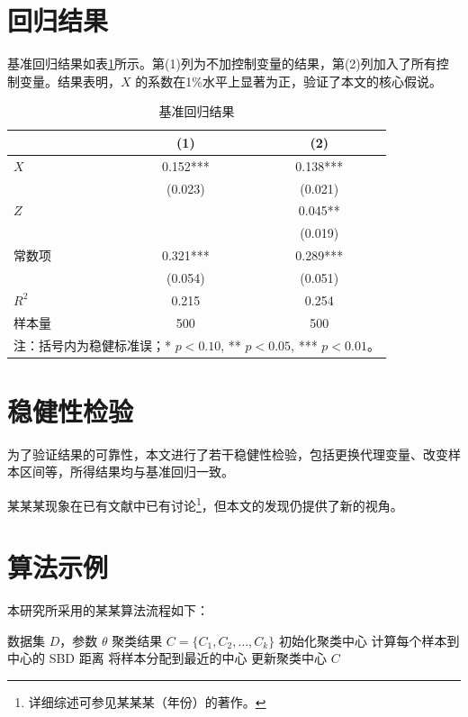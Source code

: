\documentclass[12pt,openright]{book}
\begin{document}
\section{回归结果}
基准回归结果如表\ref{tab:reg}所示。第(1)列为不加控制变量的结果，第(2)列加入了所有控制变量。结果表明，$X$ 的系数在1\%水平上显著为正，验证了本文的核心假说。

\begin{table}[H]
\centering
\caption{基准回归结果}
\label{tab:reg}
\begin{tabular}{lcc}
\toprule
 & (1) & (2) \\
\midrule
$X$ & 0.152*** & 0.138*** \\
   & (0.023)  & (0.021)  \\
$Z$ &          & 0.045**  \\
   &          & (0.019)  \\
常数项 & 0.321*** & 0.289*** \\
      & (0.054)  & (0.051)  \\
\midrule
$R^2$ & 0.215 & 0.254 \\
样本量 & 500   & 500   \\
\bottomrule
\multicolumn{3}{l}{\footnotesize 注：括号内为稳健标准误；* $p<0.10$, ** $p<0.05$, *** $p<0.01$。}\\
\end{tabular}
\end{table}

\section{稳健性检验}
为了验证结果的可靠性，本文进行了若干稳健性检验，包括更换代理变量、改变样本区间等，所得结果均与基准回归一致。

某某某现象在已有文献中已有讨论\footnote{详细综述可参见某某某（年份）的著作\cite{ref_book_cn}。}，但本文的发现仍提供了新的视角。

\section{算法示例}
本研究所采用的某某算法流程如下：
\begin{algorithm}[H]
\caption{某某算法}
\begin{algorithmic}[1]
\Require 数据集 $D$，参数 $\theta$
\Ensure 聚类结果 $C = \{C_1, C_2, \dots, C_k\}$
\State 初始化聚类中心
    \State 计算每个样本到中心的 SBD 距离
    \State 将样本分配到最近的中心
    \State 更新聚类中心
\EndFor
\State \Return $C$
\end{algorithmic}
\end{algorithm}
\end{document}
